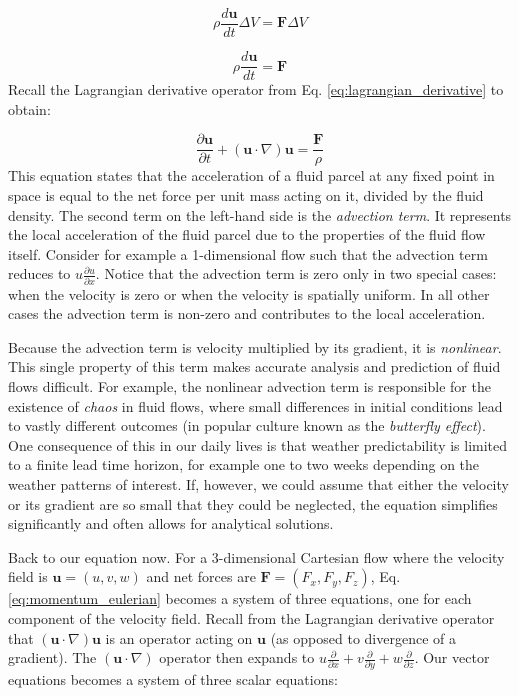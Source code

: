 \documentclass[12pt]{article}
\numberwithin{equation}{section}
\numberwithin{figure}{section}
\numberwithin{table}{section}
\begin{document}
\begin{equation}
  \rho \frac{d\mathbf{u}}{dt} \Delta V = \mathbf{F} \Delta V
\end{equation}

\begin{equation}
  \rho \frac{d\mathbf{u}}{dt} = \mathbf{F}
\end{equation}
Recall the Lagrangian derivative operator from Eq. \ref{eq:lagrangian_derivative}
to obtain:

\begin{equation}
  \frac{\partial \mathbf{u}}{\partial t} + (\mathbf{u} \cdot \nabla) \mathbf{u} = \frac{\mathbf{F}}{\rho}
  \label{eq:momentum_eulerian}
\end{equation}
This equation states that the acceleration of a fluid parcel at any fixed point
in space is equal to the net force per unit mass acting on it, divided by the
fluid density.
The second term on the left-hand side is the \textit{advection term}.
It represents the local acceleration of the fluid parcel due to the properties
of the fluid flow itself.
Consider for example a 1-dimensional flow such that the advection term reduces
to $u \frac{\partial u}{\partial x}$.
Notice that the advection term is zero only in two special cases:
when the velocity is zero or when the velocity is spatially uniform.
In all other cases the advection term is non-zero and contributes to the local
acceleration.

Because the advection term is velocity multiplied by its gradient, it is
\textit{nonlinear}.
This single property of this term makes accurate analysis and prediction of
fluid flows difficult.
For example, the nonlinear advection term is responsible for the existence of
\textit{chaos} in fluid flows, where small differences in initial
conditions lead to vastly different outcomes (in popular culture known as the
\textit{butterfly effect}).
One consequence of this in our daily lives is that weather predictability
is limited to a finite lead time horizon, for example one to two weeks depending
on the weather patterns of interest.
If, however, we could assume that either the velocity or its gradient are so
small that they could be neglected, the equation simplifies significantly
and often allows for analytical solutions.

Back to our equation now.
For a 3-dimensional Cartesian flow where the velocity field is $\mathbf{u} = (u, v, w)$
and net forces are $\mathbf{F} = (F_x, F_y, F_z)$, Eq. \ref{eq:momentum_eulerian}
becomes a system of three equations, one for each component of the velocity field.
Recall from the Lagrangian derivative operator that $(\mathbf{u} \cdot \nabla) \mathbf{u}$
is an operator acting on $\mathbf{u}$ (as opposed to divergence of a gradient).
The $(\mathbf{u} \cdot \nabla)$ operator then expands to
$u\frac{\partial}{\partial x} + v\frac{\partial}{\partial y} + w\frac{\partial}{\partial z}$.
Our vector equations becomes a system of three scalar equations:
\end{document}
